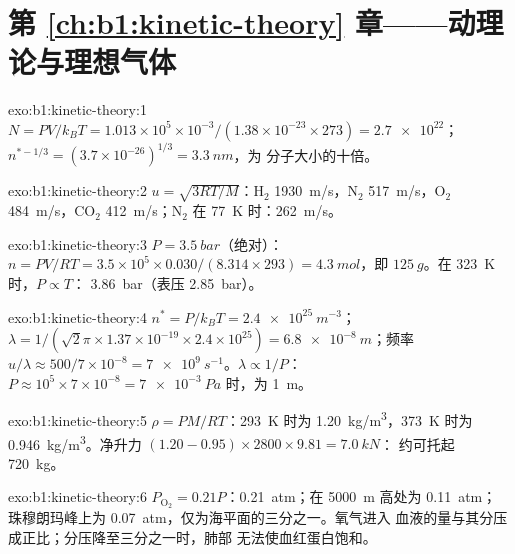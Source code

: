 \section*{第 \ref{ch:b1:kinetic-theory} 章——动理论与理想气体}

\begin{solution}{exo:b1:kinetic-theory:1}
$N = PV/k_BT = 1.013\times10^5 \times 10^{-3}/(1.38\times10^{-23} \times 273) =
\num{2.7e22}$；$n^{*-1/3} = (3.7\times10^{-26})^{1/3} = \qty{3.3}{nm}$，为
分子大小的十倍。
\end{solution}

\begin{solution}{exo:b1:kinetic-theory:2}
$u = \sqrt{3RT/M}$：H$_2$ \qty{1930}{m/s}，N$_2$ \qty{517}{m/s}，O$_2$
\qty{484}{m/s}，CO$_2$ \qty{412}{m/s}；N$_2$ 在 \qty{77}{K} 时：\qty{262}{m/s}。
\end{solution}

\begin{solution}{exo:b1:kinetic-theory:3}
$P = \qty{3.5}{bar}$（绝对）：$n = PV/RT = 3.5\times10^5 \times 0.030/(8.314
\times 293) = \qty{4.3}{mol}$，即 $\qty{125}{g}$。在 \qty{323}{K} 时，$P \propto T$：
\qty{3.86}{bar}（表压 \qty{2.85}{bar}）。
\end{solution}

\begin{solution}{exo:b1:kinetic-theory:4}
$n^* = P/k_BT = \qty{2.4e25}{m^{-3}}$；$\lambda = 1/(\sqrt2\pi \times 1.37\times
10^{-19} \times 2.4\times10^{25}) = \qty{6.8e-8}{m}$；频率 $u/\lambda \approx
500/7\times10^{-8} = \qty{7e9}{s^{-1}}$。$\lambda \propto 1/P$：
$P \approx 10^5 \times 7\times10^{-8} = \qty{7e-3}{Pa}$ 时，为 \qty{1}{m}。
\end{solution}

\begin{solution}{exo:b1:kinetic-theory:5}
$\rho = PM/RT$：\qty{293}{K} 时为 \qty{1.20}{kg/m^3}，\qty{373}{K} 时为
\qty{0.946}{kg/m^3}。净升力 $(1.20 - 0.95) \times 2800 \times 9.81 = \qty{7.0}{kN}$：
约可托起 \qty{720}{kg}。
\end{solution}

\begin{solution}{exo:b1:kinetic-theory:6}
$P_{\mathrm{O}_2} = 0.21P$：\qty{0.21}{atm}；在 \qty{5000}{m} 高处为 \qty{0.11}{atm}；
珠穆朗玛峰上为 \qty{0.07}{atm}，仅为海平面的三分之一。氧气进入
血液的量与其分压成正比；分压降至三分之一时，肺部
无法使血红蛋白饱和。
\end{solution}


